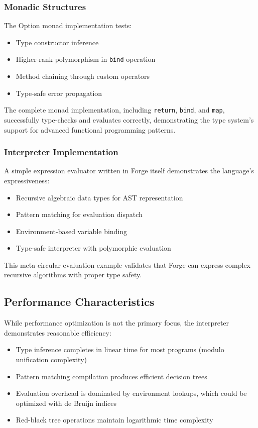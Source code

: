\documentclass[conference,onecolumn]{IEEEtran}
\begin{document}
\subsubsection{Monadic Structures}

The Option monad implementation tests:
\begin{itemize}
\item Type constructor inference
\item Higher-rank polymorphism in \texttt{bind} operation
\item Method chaining through custom operators
\item Type-safe error propagation
\end{itemize}

The complete monad implementation, including \texttt{return}, \texttt{bind}, and \texttt{map}, successfully type-checks and evaluates correctly, demonstrating the type system's support for advanced functional programming patterns.

\subsubsection{Interpreter Implementation}

A simple expression evaluator written in Forge itself demonstrates the language's expressiveness:

\begin{itemize}
\item Recursive algebraic data types for AST representation
\item Pattern matching for evaluation dispatch
\item Environment-based variable binding
\item Type-safe interpreter with polymorphic evaluation
\end{itemize}

This meta-circular evaluation example validates that Forge can express complex recursive algorithms with proper type safety.

\subsection{Performance Characteristics}

While performance optimization is not the primary focus, the interpreter demonstrates reasonable efficiency:

\begin{itemize}
\item Type inference completes in linear time for most programs (modulo unification complexity)
\item Pattern matching compilation produces efficient decision trees
\item Evaluation overhead is dominated by environment lookups, which could be optimized with de Bruijn indices
\item Red-black tree operations maintain logarithmic time complexity
\end{itemize}
\end{document}
